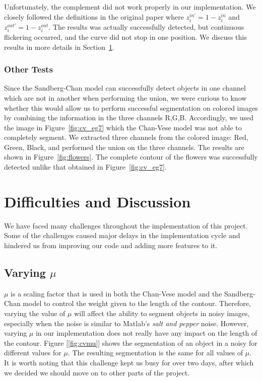 \documentclass[10pt,twocolumn,letterpaper]{article}
\begin{document}
Unfortunately, the complement did not work properly in our implementation. We closely followed the definitions in the original paper where $z_i^{in'} = 1 -
z_i^{in}$ and $z_i^{out'} = 1 - z_i^{out}$. The results was actually successfully detected, but continuous flickering occurred, and the curve did not stop in
one position. We discuss this results in more details in Section~\ref{sec:difficulties}.

\subsubsection*{Other Tests}

Since the Sandberg-Chan model can successfully detect objects in one channel which are not in another when performing the union, we were curious to know
whether this would allow us to perform successful segmentation on colored images by combining the information in the three channels R,G,B. Accordingly, we used
the image in Figure~\ref{fig:cv_eg7} which the Chan-Vese model was not able to completely segment. We extracted three channels from the colored image: Red,
Green, Black, and performed the union on the three channels. The results are shown in Figure~\ref{fig:flowers}. The complete contour of the flowers was
successfully detected unlike that obtained in Figure~\ref{fig:cv_eg7}.

\section{Difficulties and Discussion}
\label{sec:difficulties}
We have faced many challenges throughout the implementation of this project. Some of the challenges caused major delays in the implementation cycle and hindered
us from improving our code and adding more features to it. 

\subsection{Varying $\mu$}
$\mu$ is a scaling factor that is used in both the Chan-Vese model and the Sandberg-Chan model to control the weight given to the length of the contour.
Therefore, varying the value of $\mu$ will affect the ability to segment objects in noisy images, especially when the noise is similar to Matlab's \textit{salt
and pepper} noise. However, varying $\mu$ in our implementation does not really have any impact on the length of the contour. Figure [\ref{fig:cvmu}] shows the
segmentation of an object in a noisy for different values for $\mu$. The resulting segmentation is the same for all values of $\mu$. It is worth noting that
this challenge kept us busy for over two days, after which we decided we should move on to other parts of the project.
\end{document}
